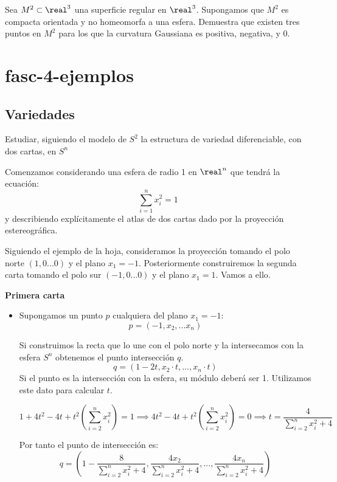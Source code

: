 \begin{problem}[4]
 Sea $M^2 \subset \real^3$ una superficie regular en $\real^3$. Supongamos que $M^2$ es compacta orientada y no homeomorfa a una esfera. Demuestra que existen tres puntos en $M^2$ para los que la curvatura Gaussiana es positiva, negativa, y 0.
\solution


\end{problem}


\section{fasc-4-ejemplos}

\subsection{Variedades}
\begin{problem}[2]
Estudiar, siguiendo el modelo de $S^2$ la estructura de variedad diferenciable, con dos cartas, en $S^n$

\solution
{}

Comenzamos considerando una esfera de radio 1 en $\real^n$ que tendrá la ecuación:
\[\sum_{i=1}^n x_i^2=1\]
y describiendo explícitamente el atlas de dos cartas dado por la proyección estereográfica.

Siguiendo el ejemplo de la hoja, consideramos la proyección tomando el polo norte $(1,0...0)$ y el plano $x_1=-1$. Posteriormente construiremos la segunda carta tomando el polo sur $(-1,0...0)$ y el plano $x_1=1$. Vamos a ello.

\textbf{Primera carta}

\begin{itemize}
\item Supongamos un punto $p$ cualquiera del plano $x_1=-1$:
\[p=(-1,x_2,...x_n)\]

Si construimos la recta que lo une con el polo norte y la intersecamos con la esfera $S^n$ obtenemos el punto intersección $q$.
\[q = \left(1-2t, x_2\cdot t,...,x_n\cdot t\right)\]
Si el punto es la intersección con la esfera, su módulo deberá ser 1. Utilizamos este dato para calcular $t$.

\[1+4t^2-4t+t^2\left(\sum_{i=2}^nx_i^2\right)=1 \implies 4t^2-4t+t^2\left(\sum_{i=2}^nx_i^2\right) = 0 \implies t=\frac{4}{\sum_{i=2}^nx_i^2+4}\]

Por tanto el punto de intersección es:
\[q=\left(1-\frac{8}{\sum_{i=2}^nx_i^2+4}, \frac{4x_2}{\sum_{i=2}^nx_i^2+4},...,\frac{4x_n}{\sum_{i=2}^nx_i^2+4} \right)\]


\end{itemize}
\end{problem}
